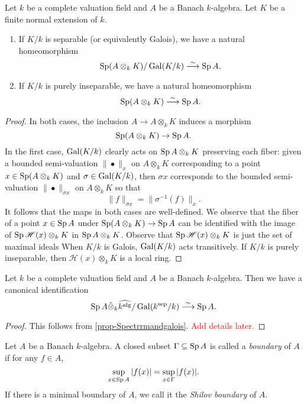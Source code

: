 \begin{proposition}\label{prop-Spectrrmandgalois}
    Let $k$ be a complete valuation field and $A$ be a Banach $k$-algebra. Let $K$ be a finite normal extension of $k$. 
    \begin{enumerate}
        \item If $K/k$ is separable (or equivalently Galois), we have a natural homeomorphism
            \[
                \operatorname{Sp} (A\otimes_k K)/\operatorname{Gal}(K/k)\stackrel{\sim}{\longrightarrow} \operatorname{Sp} A.  
            \]
        \item If $K/k$ is purely inseparable, we have a natural homeomorphism
            \[
                \operatorname{Sp}  (A\otimes_k K) \stackrel{\sim}{\longrightarrow} \operatorname{Sp} A. 
            \]
    \end{enumerate}
\end{proposition}
\begin{proof}
    In both cases, the inclusion $A\rightarrow A\otimes_k K$ induces a morphism
    \[
        \operatorname{Sp}   (A\otimes_k K)\rightarrow \operatorname{Sp} A.
    \]
    In the first case, $\operatorname{Gal}(K/k)$ clearly acts on $\operatorname{Sp} A\otimes_k K$ preserving each fiber: given a bounded semi-valuation $\|\bullet\|_x$ on $A\otimes_k K$  corresponding to a point $x\in \operatorname{Sp} (A\otimes_k K)$ and $\sigma\in \operatorname{Gal}(K/k)$, then $\sigma x$ corresponds to the bounded semi-valuation $\|\bullet\|_{\sigma x}$ on $A\otimes_k K$ so that 
    \[
        \|f\|_{\sigma x}=\|\sigma^{-1}(f)\|_x.  
    \]
    It follows that the maps in both cases are well-defined. We observe that the fiber of a point $x\in \operatorname{Sp} A$ under $\operatorname{Sp}   (A\otimes_k K)\rightarrow \operatorname{Sp} A$ can be identified with the image of $\operatorname{Sp} \mathscr{H}(x)\otimes_k K$ in $\operatorname{Sp} A\otimes_k K$. Observe that $\operatorname{Sp} \mathscr{H}(x)\otimes_k K$ is just the set of maximal ideals
     When $K/k$ is Galois, $\operatorname{Gal}(K/k)$ acts transitively. If $K/k$ is purely inseparable, then $\mathscr{H}(x)\otimes_k K$ is a local ring.
\end{proof}

\begin{corollary}\label{cor-Spalgclosure}
    Let $k$ be a complete valuation field and $A$ be a Banach $k$-algebra. Then we have a canonical identification
    \[
        \operatorname{Sp} A\hat{\otimes}_k \widehat{k^{\mathrm{alg}}}  /\operatorname{Gal}(k^{\mathrm{sep}}/k)\stackrel{\sim}{\longrightarrow} \operatorname{Sp} A.
    \]
\end{corollary}
\begin{proof}
    This follows from \cref{prop-Spectrrmandgalois}. \textcolor{red}{Add details later.}
\end{proof}

\begin{definition}\label{def-Shilovboundary}
    Let $A$ be a Banach $k$-algebra. A closed subset $\Gamma\subseteq\operatorname{Sp} A$ is called a \emph{boundary} of $A$ if for any $f\in A$,
    \[
        \sup_{x\in \operatorname{Sp} A}|f(x)|=\sup_{x\in \Gamma}|f(x)|.
    \] 
    If there is a minimal boundary of $A$, we call it the \emph{Shilov boundary} of $A$.
\end{definition}


